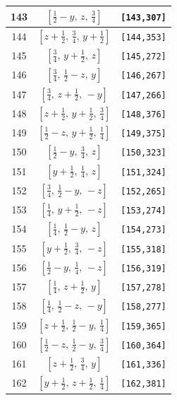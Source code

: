 \documentclass[fleqn,8pt]{jsarticle}
\begin{document}
\begin{longtable}{ccc}
143 & $\left[ \frac{1}{2} - y,\, z,\, \frac{3}{4} \right]$ & {\tt [143,307]} \\ \hline
144 & $\left[ z + \frac{1}{2},\, \frac{3}{4},\, y + \frac{1}{2} \right]$ & {\tt [144,353]} \\ \hline
145 & $\left[ \frac{3}{4},\, y + \frac{1}{2},\, z \right]$ & {\tt [145,272]} \\ \hline
146 & $\left[ \frac{3}{4},\, \frac{1}{2} - z,\, y \right]$ & {\tt [146,267]} \\ \hline
147 & $\left[ \frac{3}{4},\, z + \frac{1}{2},\, - y \right]$ & {\tt [147,266]} \\ \hline
148 & $\left[ z + \frac{1}{2},\, y + \frac{1}{2},\, \frac{3}{4} \right]$ & {\tt [148,376]} \\ \hline
149 & $\left[ \frac{1}{2} - z,\, y + \frac{1}{2},\, \frac{1}{4} \right]$ & {\tt [149,375]} \\ \hline
150 & $\left[ \frac{1}{2} - y,\, \frac{3}{4},\, z \right]$ & {\tt [150,323]} \\ \hline
151 & $\left[ y + \frac{1}{2},\, \frac{1}{4},\, z \right]$ & {\tt [151,324]} \\ \hline
152 & $\left[ \frac{3}{4},\, \frac{1}{2} - y,\, - z \right]$ & {\tt [152,265]} \\ \hline
153 & $\left[ \frac{1}{4},\, y + \frac{1}{2},\, - z \right]$ & {\tt [153,274]} \\ \hline
154 & $\left[ \frac{1}{4},\, \frac{1}{2} - y,\, z \right]$ & {\tt [154,273]} \\ \hline
155 & $\left[ y + \frac{1}{2},\, \frac{3}{4},\, - z \right]$ & {\tt [155,318]} \\ \hline
156 & $\left[ \frac{1}{2} - y,\, \frac{1}{4},\, - z \right]$ & {\tt [156,319]} \\ \hline
157 & $\left[ \frac{1}{4},\, z + \frac{1}{2},\, y \right]$ & {\tt [157,278]} \\ \hline
158 & $\left[ \frac{1}{4},\, \frac{1}{2} - z,\, - y \right]$ & {\tt [158,277]} \\ \hline
159 & $\left[ z + \frac{1}{2},\, \frac{1}{2} - y,\, \frac{1}{4} \right]$ & {\tt [159,365]} \\ \hline
160 & $\left[ \frac{1}{2} - z,\, \frac{1}{2} - y,\, \frac{3}{4} \right]$ & {\tt [160,364]} \\ \hline
161 & $\left[ z + \frac{1}{2},\, \frac{3}{4},\, y \right]$ & {\tt [161,336]} \\ \hline
162 & $\left[ y + \frac{1}{2},\, z + \frac{1}{2},\, \frac{1}{4} \right]$ & {\tt [162,381]} \\ \hline

\end{longtable}
\end{document}
